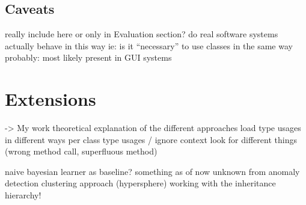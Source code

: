 \subsection{Caveats}
really include here or only in Evaluation section?
do real software systems actually behave in this way
ie: is it ``necessary'' to use classes in the same way
probably: most likely present in GUI systems

\section{Extensions}
-> My work
theoretical explanation of the different approaches
    load type usages in different ways
        per class type usages / ignore context
    look for different things (wrong method call, superfluous method)

    naive bayesian learner as baseline?
    something as of now unknown from anomaly detection
    clustering approach (hypersphere)
    working with the inheritance hierarchy!


